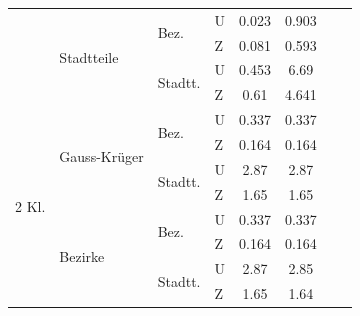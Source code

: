 \documentclass{Vorlage}
\begin{document}
\begin{table}[h]
\begin{tabular}{llll|cc|cc}
                        & \multirow{4}{*}{Stadtteile}   & \multirow{2}{*}{Bez.}    & U & 0.023       & 0.903      &                   &                 \\
                        &                               &                          & Z & 0.081       & 0.593      &                   &                 \\ \cline{3-8} 
                        &                               & \multirow{2}{*}{Stadtt.} & U & 0.453       & 6.69       &                   &                 \\
                        &                               &                          & Z & 0.61        & 4.641       &                   &                 \\ \hline
\multirow{8}{*}{2 Kl.}  & \multirow{4}{*}{Gauss-Krüger} & \multirow{2}{*}{Bez.}    & U & 0.337       & 0.337      &                   &                 \\
                        &                               &                          & Z & 0.164      & 0.164      &                   &                 \\ \cline{3-8} 
                        &                               & \multirow{2}{*}{Stadtt.} & U & 2.87       & 2.87      &                   &                 \\
                        &                               &                          & Z & 1.65       & 1.65      &                   &                 \\ \cline{2-8} 
                        & \multirow{4}{*}{Bezirke}      & \multirow{2}{*}{Bez.}    & U & 0.337       & 0.337      &                   &                 \\
                        &                               &                          & Z & 0.164       & 0.164      &                   &                 \\ \cline{3-8} 
                        &                               & \multirow{2}{*}{Stadtt.} & U & 2.87        & 2.85      &                   &                 \\
                        &                               &                          & Z & 1.65        & 1.64     &                   &                 \\ \hline \hline
\end{tabular}
\end{table}
\end{document}
